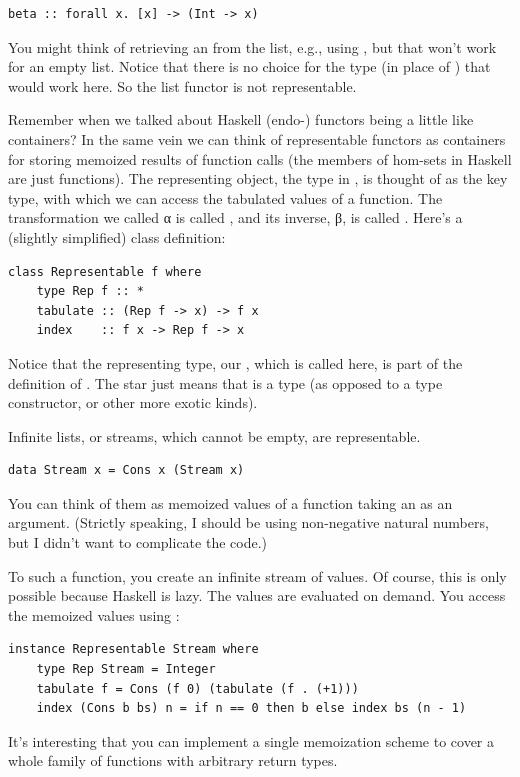 \begin{Verbatim}[commandchars=\\\{\}]
beta :: forall x. [x] -> (Int -> x)
\end{Verbatim}
You might think of retrieving an  from the list, e.g., using
, but that won't work for an empty list. Notice that there
is no choice for the type  (in place of ) that
would work here. So the list functor is not representable.

Remember when we talked about Haskell (endo-) functors being a little
like containers? In the same vein we can think of representable functors
as containers for storing memoized results of function calls (the
members of hom-sets in Haskell are just functions). The representing
object, the type  in , is thought of as the
key type, with which we can access the tabulated values of a function.
The transformation we called α is called , and its
inverse, β, is called . Here's a (slightly simplified)
 class definition:

\begin{Verbatim}[commandchars=\\\{\}]
class Representable f where
    type Rep f :: *
    tabulate :: (Rep f -> x) -> f x
    index    :: f x -> Rep f -> x
\end{Verbatim}
Notice that the representing type, our , which is called
 here, is part of the definition of
. The star just means that  is a
type (as opposed to a type constructor, or other more exotic kinds).

Infinite lists, or streams, which cannot be empty, are representable.

\begin{Verbatim}[commandchars=\\\{\}]
data Stream x = Cons x (Stream x)
\end{Verbatim}
You can think of them as memoized values of a function taking an
 as an argument. (Strictly speaking, I should be using
non-negative natural numbers, but I didn't want to complicate the code.)

To  such a function, you create an infinite stream of
values. Of course, this is only possible because Haskell is lazy. The
values are evaluated on demand. You access the memoized values using
:

\begin{Verbatim}[commandchars=\\\{\}]
instance Representable Stream where
    type Rep Stream = Integer
    tabulate f = Cons (f 0) (tabulate (f . (+1)))
    index (Cons b bs) n = if n == 0 then b else index bs (n - 1)
\end{Verbatim}
It's interesting that you can implement a single memoization scheme to
cover a whole family of functions with arbitrary return types.


